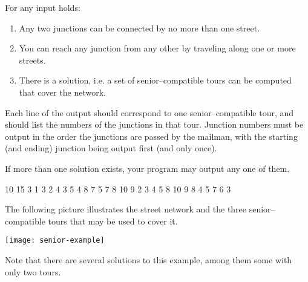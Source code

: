 \documentclass{boi2014}
\begin{document}
    For any input holds:
    \begin{enumerate}
        \item Any two junctions can be connected by no more than one street.
        \item You can reach any junction from any other by traveling along one or more streets.
        \item There is a solution, i.e. a set of senior--compatible tours can be
        computed that cover the network.
    \end{enumerate}

    \Output
    Each line of the output should correspond to one senior--compatible tour,
    and should list the numbers of the junctions in that tour.
    Junction numbers must be output in the order the junctions are passed by the mailman,
    with the
    starting (and ending) junction being output first (and only once).

    If more than one solution exists, your program may output any one of them.

    \Example

    \example
    {
        10 15  3  1 3  2 4  3 5  4 8  7  5 7  8  10  9
    }
    {
        2 3 4 5 8 10 9  8 4  5 7 6 3
    }
    {
        The following picture illustrates the street network and the three
        senior--compatible tours that may be used to cover it.

        \texttt{[image: senior-example]}

        Note that there are several solutions to this example, among them some
        with only two tours.
    
    }
\end{document}
